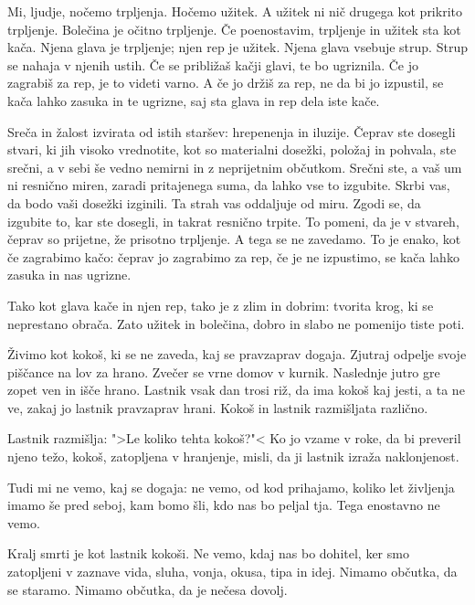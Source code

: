 \clearpage


Mi, ljudje, nočemo trpljenja. Hočemo užitek. A užitek ni nič drugega kot prikrito trpljenje. Bolečina je očitno trpljenje. Če poenostavim, trpljenje in užitek sta kot kača. Njena glava je trpljenje; njen rep je užitek. Njena glava vsebuje strup. Strup se nahaja v njenih ustih. Če se približaš kačji glavi, te bo ugriznila. Če jo zagrabiš za rep, je to videti varno. A če jo držiš za rep, ne da bi jo izpustil, se kača lahko zasuka in te ugrizne, saj sta glava in rep dela iste kače.

Sreča in žalost izvirata od istih staršev: hrepenenja in iluzije. Čeprav ste dosegli stvari, ki jih visoko vrednotite, kot so materialni dosežki, položaj in pohvala, ste srečni, a v sebi še vedno nemirni in z neprijetnim občutkom. Srečni ste, a vaš um ni resnično miren, zaradi pritajenega suma, da lahko vse to izgubite. Skrbi vas, da bodo vaši dosežki izginili. Ta strah vas oddaljuje od miru. Zgodi se, da izgubite to, kar ste dosegli, in takrat resnično trpite. To pomeni, da je v stvareh, čeprav so prijetne, že prisotno trpljenje. A tega se ne zavedamo. To je enako, kot če zagrabimo kačo: čeprav jo zagrabimo za rep, če je ne izpustimo, se kača lahko zasuka in nas ugrizne.

Tako kot glava kače in njen rep, tako je z zlim in dobrim: tvorita krog, ki se neprestano obrača. Zato užitek in bolečina, dobro in slabo ne pomenijo tiste poti.

\clearpage


Živimo kot kokoš, ki se ne zaveda, kaj se pravzaprav dogaja. Zjutraj odpelje svoje piščance na lov za hrano. Zvečer se vrne domov v kurnik. Naslednje jutro gre zopet ven in išče hrano. Lastnik vsak dan trosi riž, da ima kokoš kaj jesti, a ta ne ve, zakaj jo lastnik pravzaprav hrani. Kokoš in lastnik razmišljata različno.

Lastnik razmišlja: ">Le koliko tehta kokoš?"< Ko jo vzame v roke, da bi preveril njeno težo, kokoš, zatopljena v hranjenje, misli, da ji lastnik izraža naklonjenost.

Tudi mi ne vemo, kaj se dogaja: ne vemo, od kod prihajamo, koliko let življenja imamo še pred seboj, kam bomo šli, kdo nas bo peljal tja. Tega enostavno ne vemo.

Kralj smrti je kot lastnik kokoši. Ne vemo, kdaj nas bo dohitel, ker smo zatopljeni v zaznave vida, sluha, vonja, okusa, tipa in idej. Nimamo občutka, da se staramo. Nimamo občutka, da je nečesa dovolj.

